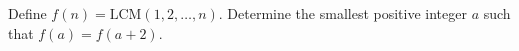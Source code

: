 Define $f\left(n\right)=\textrm{LCM}\left(1,2,\ldots,n\right)$. Determine the smallest positive integer $a$ such that $f\left(a\right)=f\left(a+2\right)$.